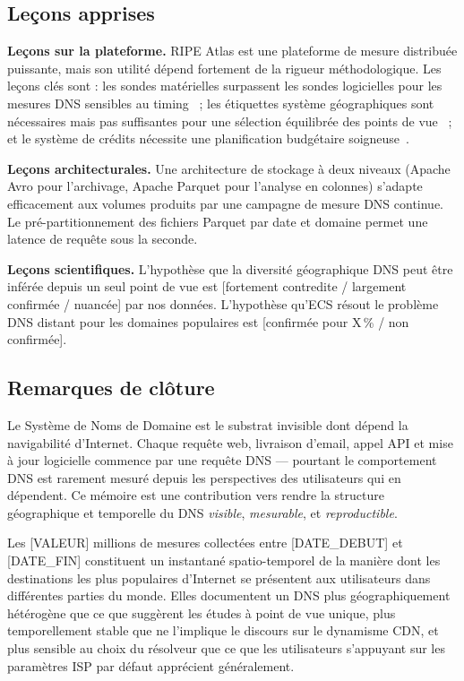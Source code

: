 \subsection{Leçons apprises}
\label{subsec:5.5.4}

\textbf{Leçons sur la plateforme.}
RIPE Atlas est une plateforme de mesure distribuée puissante, mais son utilité dépend fortement de la rigueur méthodologique. Les leçons clés sont : les sondes matérielles surpassent les sondes logicielles pour les mesures DNS sensibles au timing~\cite{Holterbach2015} ; les étiquettes système géographiques sont nécessaires mais pas suffisantes pour une sélection équilibrée des points de vue~\cite{Bajpai2017} ; et le système de crédits nécessite une planification budgétaire soigneuse~\cite{Nosyk2024}.

\textbf{Leçons architecturales.}
Une architecture de stockage à deux niveaux (Apache Avro pour l'archivage, Apache Parquet pour l'analyse en colonnes) s'adapte efficacement aux volumes produits par une campagne de mesure DNS continue. Le pré-partitionnement des fichiers Parquet par date et domaine permet une latence de requête sous la seconde.

\textbf{Leçons scientifiques.}
L'hypothèse que la diversité géographique DNS peut être inférée depuis un seul point de vue est [fortement contredite / largement confirmée / nuancée] par nos données. L'hypothèse qu'ECS résout le problème DNS distant pour les domaines populaires est [confirmée pour X\,\% / non confirmée].
\bigskip
\subsection{Remarques de clôture}
\label{subsec:5.5.5}

Le Système de Noms de Domaine est le substrat invisible dont dépend la navigabilité d'Internet. Chaque requête web, livraison d'email, appel API et mise à jour logicielle commence par une requête DNS --- pourtant le comportement DNS est rarement mesuré depuis les perspectives des utilisateurs qui en dépendent. Ce mémoire est une contribution vers rendre la structure géographique et temporelle du DNS \textit{visible}, \textit{mesurable}, et \textit{reproductible}.

Les [VALEUR] millions de mesures collectées entre [DATE\_DEBUT] et [DATE\_FIN] constituent un instantané spatio-temporel de la manière dont les destinations les plus populaires d'Internet se présentent aux utilisateurs dans différentes parties du monde. Elles documentent un DNS plus géographiquement hétérogène que ce que suggèrent les études à point de vue unique, plus temporellement stable que ne l'implique le discours sur le dynamisme CDN, et plus sensible au choix du résolveur que ce que les utilisateurs s'appuyant sur les paramètres ISP par défaut apprécient généralement.

